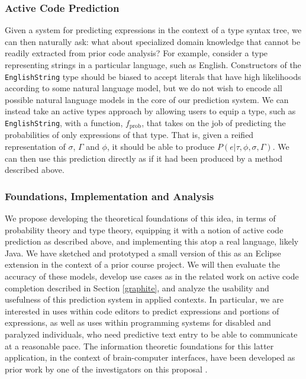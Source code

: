 \subsubsection{Active Code Prediction}
Given a system for predicting expressions in the context of a type syntax tree, we can then naturally ask: what about specialized domain knowledge that cannot be readily extracted from prior code analysis? For example, consider a type representing strings in a particular language, such as English. Constructors of the \verb|EnglishString| type should be biased to accept literals that have high likelihoods according to some natural language model, but we do not wish to encode all possible natural language models in the core of our prediction system. We can instead take an active types approach by allowing users to equip a type, such as \verb|EnglishString|, with a function, $f_{\text{prob}}$, that takes on the job of predicting the probabilities of only expressions of that type. That is, given a reified representation of $\sigma$, $\Gamma$ and $\phi$, it should be able to produce $P(e | \tau, \phi, \sigma, \Gamma)$. We can then use this prediction directly as if it had been produced by a method described above.

\subsubsection{Foundations, Implementation and Analysis}
We propose developing the theoretical foundations of this idea, in terms of probability theory and type theory, equipping it with a notion of active code prediction as described above, and implementing this atop a real language, likely Java. We have sketched and prototyped a small version of this as an Eclipse extension in the context of a prior course project. We will then evaluate the accuracy of these models, develop use cases as in the related work on active code completion described in Section \ref{graphite}, and analyze the usability and usefulness of this prediction system in applied contexts. In particular, we are interested in uses within code editors to predict expressions and portions of expressions, as well as uses within programming systems for disabled and paralyzed individuals, who need predictive text entry to be able to communicate at a reasonable pace. The information theoretic foundations for this latter application, in the context of brain-computer interfaces, have been developed as prior work by one of the investigators on this proposal \cite{journals/ijhci/OmarAJBMMMC11}.

